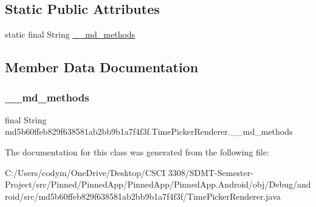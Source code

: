 \subsection*{Static Public Attributes}
\begin{DoxyCompactItemize}
\item 
static final String \hyperlink{classmd5b60ffeb829f638581ab2bb9b1a7f4f3f_1_1_time_picker_renderer_a3c77da783a54f125d97047436f80a34c}{\+\_\+\+\_\+md\+\_\+methods}
\end{DoxyCompactItemize}


\subsection{Member Data Documentation}
\mbox{\label{classmd5b60ffeb829f638581ab2bb9b1a7f4f3f_1_1_time_picker_renderer_a3c77da783a54f125d97047436f80a34c}} 
\subsubsection{\texorpdfstring{\+\_\+\+\_\+md\+\_\+methods}{\_\_md\_methods}}
{\footnotesize\ttfamily final String md5b60ffeb829f638581ab2bb9b1a7f4f3f.\+Time\+Picker\+Renderer.\+\_\+\+\_\+md\+\_\+methods\hspace{0.3cm}{\ttfamily [static]}}



The documentation for this class was generated from the following file\+:\begin{DoxyCompactItemize}
\item 
C\+:/\+Users/codym/\+One\+Drive/\+Desktop/\+C\+S\+C\+I 3308/\+S\+D\+M\+T-\/\+Semester-\/\+Project/src/\+Pinned/\+Pinned\+App/\+Pinned\+App/\+Pinned\+App.\+Android/obj/\+Debug/android/src/md5b60ffeb829f638581ab2bb9b1a7f4f3f/Time\+Picker\+Renderer.\+java\end{DoxyCompactItemize}
